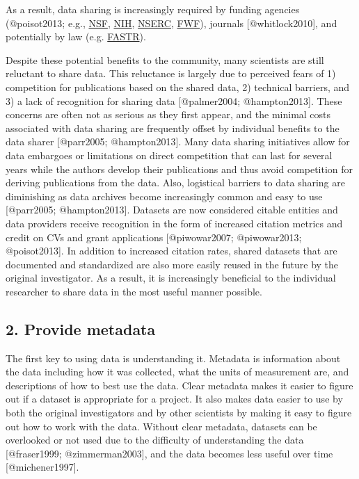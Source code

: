 As a result, data sharing is increasingly required by funding agencies
(@poisot2013; e.g.,
\href{http://www.nsf.gov/bfa/dias/policy/dmp.jsp}{NSF},
\href{http://grants.nih.gov/grants/guide/notice-files/NOT-OD-03-032.html}{NIH},
\href{http://www.nserc-crsng.gc.ca/Professors-Professeurs/FinancialAdminGuide-GuideAdminFinancier/Responsibilities-Responsabilites_eng.asp}{NSERC},
\href{http://www.fwf.ac.at/en/public_relations/oai/index.html}{FWF}),
journals {[}@whitlock2010{]}, and potentially by law (e.g.
\href{http://doyle.house.gov/sites/doyle.house.gov/files/documents/2013\%2002\%2014\%20DOYLE\%20FASTR\%20FINAL.pdf}{FASTR}).

Despite these potential benefits to the community, many scientists are
still reluctant to share data. This reluctance is largely due to
perceived fears of 1) competition for publications based on the shared
data, 2) technical barriers, and 3) a lack of recognition for sharing
data {[}@palmer2004; @hampton2013{]}. These concerns are often not as
serious as they first appear, and the minimal costs associated with data
sharing are frequently offset by individual benefits to the data sharer
{[}@parr2005; @hampton2013{]}. Many data sharing initiatives allow for
data embargoes or limitations on direct competition that can last for
several years while the authors develop their publications and thus
avoid competition for deriving publications from the data. Also,
logistical barriers to data sharing are diminishing as data archives
become increasingly common and easy to use {[}@parr2005;
@hampton2013{]}. Datasets are now considered citable entities and data
providers receive recognition in the form of increased citation metrics
and credit on CVs and grant applications {[}@piwowar2007; @piwowar2013;
@poisot2013{]}. In addition to increased citation rates, shared datasets
that are documented and standardized are also more easily reused in the
future by the original investigator. As a result, it is increasingly
beneficial to the individual researcher to share data in the most useful
manner possible.

\subsection{2. Provide metadata}\label{provide-metadata}

The first key to using data is understanding it. Metadata is information
about the data including how it was collected, what the units of
measurement are, and descriptions of how to best use the data. Clear
metadata makes it easier to figure out if a dataset is appropriate for a
project. It also makes data easier to use by both the original
investigators and by other scientists by making it easy to figure out
how to work with the data. Without clear metadata, datasets can be
overlooked or not used due to the difficulty of understanding the data
{[}@fraser1999; @zimmerman2003{]}, and the data becomes less useful over
time {[}@michener1997{]}.

